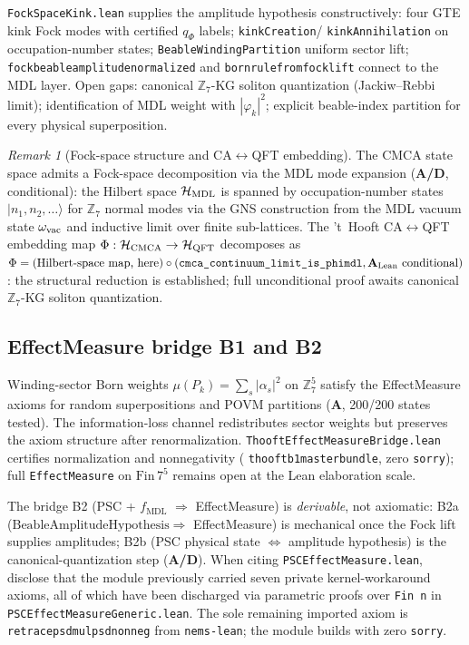 \documentclass[11pt]{article}
\theoremstyle{remark}
\newtheorem{remark}[theorem]{Remark}
\newcommand{\MDL}{\text{MDL}}
\newcommand{\ZS}{\mathbb{Z}_7}
\newcommand{\lean}[1]{%
  \penalty-100
  \begingroup\def\_{\textunderscore\allowbreak}\texttt{#1}\endgroup}
\newcommand{\CatA}{\textbf{A}}
\newcommand{\CatAL}{\ensuremath{\textbf{A}_{\rm Lean}}}
\newcommand{\CatAD}{\textbf{A/D}}
\begin{document}
\lean{FockSpaceKink.lean} supplies the amplitude hypothesis constructively:
four GTE kink Fock modes with certified $q_\Phi$ labels;
\lean{kinkCreation}/\lean{kinkAnnihilation} on occupation-number states;
\lean{BeableWindingPartition} uniform sector lift;
\lean{fock\_beable\_amplitude\_normalized} and
\lean{born\_rule\_from\_fock\_lift} connect to the MDL layer.
Open gaps: canonical $\ZS$-KG soliton quantization (Jackiw--Rebbi limit);
identification of MDL weight with $|\varphi_k|^2$; explicit beable-index partition
for every physical superposition.

\begin{remark}[Fock-space structure and CA$\leftrightarrow$QFT embedding]
The CMCA state space admits a Fock-space decomposition via the MDL mode expansion
(\CatAD, conditional): the Hilbert space $\mathcal{H}_{\rm MDL}$ is spanned by
occupation-number states $|n_1,n_2,\ldots\rangle$ for $\mathbb{Z}_7$ normal modes
via the GNS construction from the MDL vacuum state $\omega_{\rm vac}$ and inductive
limit over finite sub-lattices.
The 't~Hooft CA$\leftrightarrow$QFT embedding map
$\Phi:\mathcal{H}_{\rm CMCA}\to\mathcal{H}_{\rm QFT}$ decomposes as
$\Phi = (\text{Hilbert-space map, here}) \circ (\texttt{cmca\_continuum\_limit\_is\_phimdl},\CatAL\ \text{conditional})$:
the structural reduction is established; full unconditional proof awaits
canonical $\mathbb{Z}_7$-KG soliton quantization.
\end{remark}

\subsection{EffectMeasure bridge B1 and B2}
\label{ssec:effectmeasure_bridge}

Winding-sector Born weights $\mu(P_k) = \sum_s |\alpha_s|^2$ on $\mathbb{Z}_7^5$
satisfy the EffectMeasure axioms for random superpositions and POVM partitions
(\CatA, 200/200 states tested).
The information-loss channel redistributes sector weights but preserves the axiom
structure after renormalization.
\lean{ThooftEffectMeasureBridge.lean} certifies normalization and nonnegativity
(\lean{thooft\_b1\_master\_bundle}, zero \texttt{sorry}); full
\lean{EffectMeasure} on $\mathrm{Fin}\,7^5$ remains open at the Lean elaboration scale.

The bridge B2 (PSC + $f_{\MDL}$ $\Rightarrow$ EffectMeasure) is \emph{derivable},
not axiomatic: B2a ($\mathrm{BeableAmplitudeHypothesis} \Rightarrow$ EffectMeasure)
is mechanical once the Fock lift supplies amplitudes; B2b (PSC physical state
$\Leftrightarrow$ amplitude hypothesis) is the canonical-quantization step (\CatAD).
When citing \lean{PSCEffectMeasure.lean}, disclose that the module previously
carried seven private kernel-workaround axioms, all of which have been discharged
via parametric proofs over \lean{Fin n} in \lean{PSCEffectMeasureGeneric.lean}.
The sole remaining imported axiom is
\lean{re\_trace\_psd\_mul\_psd\_nonneg} from \lean{nems-lean}; the module builds
with zero \texttt{sorry}.
\end{document}
